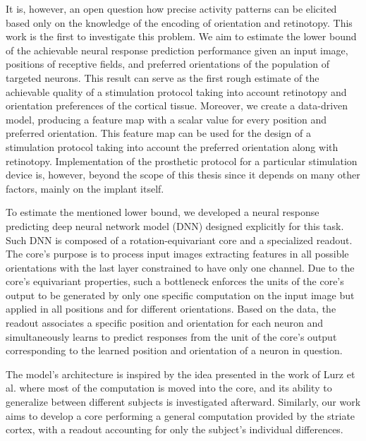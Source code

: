 It is, however, an open question how precise activity patterns can be elicited based only on the knowledge of the encoding of orientation and retinotopy. This work is the first to investigate this problem. We aim to estimate the lower bound of the achievable neural response prediction performance given an input image, positions of receptive fields, and preferred orientations of the population of targeted neurons. This result can serve as the first rough estimate of the achievable quality of a stimulation protocol taking into account retinotopy and orientation preferences of the cortical tissue. Moreover, we create a data-driven model, producing a feature map with a scalar value for every position and preferred orientation. This feature map can be used for the design of a stimulation protocol taking into account the preferred orientation along with retinotopy. Implementation of the prosthetic protocol for a particular stimulation device is, however, beyond the scope of this thesis since it depends on many other factors, mainly on the implant itself.

To estimate the mentioned lower bound, we developed a neural response predicting deep neural network model (DNN) designed explicitly for this task. Such DNN is composed of a rotation-equivariant core and a specialized readout. The core’s purpose is to process input images extracting features in all possible orientations with the last layer constrained to have only one channel. Due to the core's equivariant properties, such a bottleneck enforces the units of the core's output to be generated by only one specific computation on the input image but applied in all positions and for different orientations. Based on the data, the readout associates a specific position and orientation for each neuron and simultaneously learns to predict responses from the unit of the core's output corresponding to the learned position and orientation of a neuron in question.

The model’s architecture is inspired by the idea presented in the work of Lurz et al. \citep{lurz2021generalization} where most of the computation is moved into the core, and its ability to generalize between different subjects is investigated afterward. Similarly, our work aims to develop a core performing a general computation provided by the striate cortex, with a readout accounting for only the subject’s individual differences.

